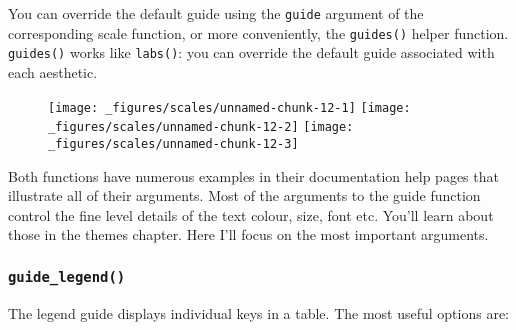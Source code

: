 You can override the default guide using the \texttt{guide} argument of
the corresponding scale function, or more conveniently, the
\texttt{guides()} helper function. \texttt{guides()} works like
\texttt{labs()}: you can override the default guide associated with each
aesthetic.

\begin{Shaded}
\begin{Highlighting}[]
\StringTok{ }\NormalTok{(} \NormalTok{, } \OperatorTok{:}\NormalTok{, } \OperatorTok{:}\NormalTok{)}
\StringTok{ }\OperatorTok{+}\StringTok{ }\NormalTok{(}\NormalTok{(}
\OperatorTok{+}\StringTok{ }\NormalTok{(} \NormalTok{())}
\OperatorTok{+}\StringTok{ }\NormalTok{(} \NormalTok{())}
\end{Highlighting}
\end{Shaded}

\begin{figure}[H]
  \texttt{[image: \_figures/scales/unnamed-chunk-12-1]}%
  \texttt{[image: \_figures/scales/unnamed-chunk-12-2]}%
  \texttt{[image: \_figures/scales/unnamed-chunk-12-3]}
\end{figure}

Both functions have numerous examples in their documentation help pages
that illustrate all of their arguments. Most of the arguments to the
guide function control the fine level details of the text colour, size,
font etc. You'll learn about those in the themes chapter. Here I'll
focus on the most important arguments.

\hypertarget{guide_legend}{%
\subsubsection{\texorpdfstring{\texttt{guide\_legend()}}{guide\_legend()}}\label{guide_legend}}

The legend guide displays individual keys in a table. The most useful
options are: 

